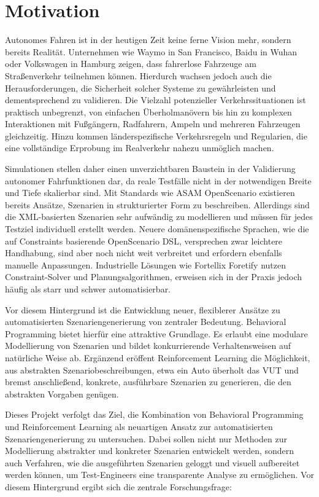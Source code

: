 \chapter{Motivation}
Autonomes Fahren ist in der heutigen Zeit keine ferne Vision mehr, sondern bereits Realität. Unternehmen wie Waymo in San Francisco, Baidu in Wuhan oder Volkswagen in Hamburg zeigen, dass fahrerlose Fahrzeuge am Straßenverkehr teilnehmen können. Hierdurch wachsen jedoch auch die Herausforderungen, die Sicherheit solcher Systeme zu gewährleisten und dementsprechend zu validieren. Die Vielzahl potenzieller Verkehrssituationen ist praktisch unbegrenzt, von einfachen Überholmanövern bis hin zu komplexen Interaktionen mit Fußgängern, Radfahrern, Ampeln und mehreren Fahrzeugen gleichzeitig. Hinzu kommen länderspezifische Verkehrsregeln und Regularien, die eine vollständige Erprobung im Realverkehr nahezu unmöglich machen.

Simulationen stellen daher einen unverzichtbaren Baustein in der Validierung autonomer Fahrfunktionen dar, da reale Testfälle nicht in der notwendigen Breite und Tiefe skalierbar sind. Mit Standards wie ASAM OpenScenario existieren bereits Ansätze, Szenarien in strukturierter Form zu beschreiben. Allerdings sind die XML-basierten Szenarien sehr aufwändig zu modellieren und müssen für jedes Testziel individuell erstellt werden. Neuere domänenspezifische Sprachen, wie die auf Constraints basierende OpenScenario DSL, versprechen zwar leichtere Handhabung, sind aber noch nicht weit verbreitet und erfordern ebenfalls manuelle Anpassungen. Industrielle Lösungen wie Fortellix Foretify nutzen Constraint-Solver und Planungsalgorithmen, erweisen sich in der Praxis jedoch häufig als starr und schwer automatisierbar.

Vor diesem Hintergrund ist die Entwicklung neuer, flexiblerer Ansätze zu automatisierten Szenariengenerierung von zentraler Bedeutung. Behavioral Programming bietet hierfür eine attraktive Grundlage. Es erlaubt eine modulare Modellierung von Szenarien und bildet konkurrierende Verhaltensweisen auf natürliche Weise ab. Ergänzend eröffent Reinforcement Learning die Möglichkeit, aus abstrakten Szenariobeschreibungen, etwa ein Auto überholt das VUT und bremst anschließend, konkrete, ausführbare Szenarien zu generieren, die den abstrakten Vorgaben genügen.

Dieses Projekt verfolgt das Ziel, die Kombination von Behavioral Programming und Reinforcement Learning als neuartigen Ansatz zur automatisierten Szenariengenerierung zu untersuchen. Dabei sollen nicht nur Methoden zur Modellierung abstrakter und konkreter Szenarien entwickelt werden, sondern auch Verfahren, wie die ausgeführten Szenarien geloggt und visuell aufbereitet werden können, um Test-Engineers eine transparente Analyse zu ermöglichen. Vor diesem Hintergrund ergibt sich die zentrale Forschungsfrage: 

